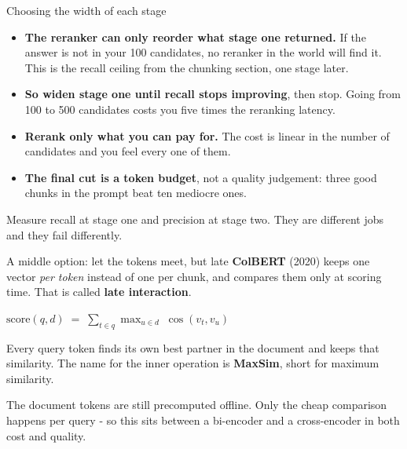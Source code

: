\documentclass[aspectratio=169]{beamer}
\newcommand{\keybox}[1]{%
  \begin{tcolorbox}[colback=armblue!8, colframe=armblue, boxrule=0.6pt, arc=2pt]
  #1
  \end{tcolorbox}}
\newcommand{\takebox}[1]{%
  \begin{tcolorbox}[colback=paramgreen!8, colframe=paramgreen, boxrule=0.6pt, arc=2pt]
  #1
  \end{tcolorbox}}
\begin{document}
\begin{frame}{Choosing the width of each stage}
  \vspace{0.7em}
  \begin{itemize}
    \item \textbf{The reranker can only reorder what stage one returned.} If the answer is
      not in your 100 candidates, no reranker in the world will find it. This is the recall
      ceiling from the chunking section, one stage later.
    \item \textbf{So widen stage one until recall stops improving}, then stop. Going from
      100 to 500 candidates costs you five times the reranking latency.
    \item \textbf{Rerank only what you can pay for.} The cost is linear in the number of
      candidates and you feel every one of them.
    \item \textbf{The final cut is a token budget}, not a quality judgement: three good
      chunks in the prompt beat ten mediocre ones.
  \end{itemize}

  \vspace{0.7em}
  \takebox{Measure recall at stage one and precision at stage two. They are different jobs
  and they fail differently.}
\end{frame}

\begin{frame}{A middle option: let the tokens meet, but late}
  \vspace{0.6em}
  \textbf{ColBERT} (2020) keeps one vector \emph{per token} instead of one per chunk, and
  compares them only at scoring time. That is called \textbf{late interaction}.

  \vspace{0.9em}
  \begin{center}
  \begin{tcolorbox}[colback=armblue!8, colframe=armblue, boxrule=0.8pt, arc=3pt, width=0.78\textwidth]
    \vspace{0.1em}
    \begin{center}
    $\displaystyle \text{score}(q, d) \;=\; \sum_{t \in q} \max_{u \in d}\; \cos(v_t, v_u)$
    \end{center}
    \vspace{0.1em}
  \end{tcolorbox}
  \end{center}

  \vspace{0.7em}
  Every query token finds its own best partner in the document and keeps that similarity.
  The name for the inner operation is \textbf{MaxSim}, short for maximum similarity.

  \vspace{0.7em}
  \keybox{The document tokens are still precomputed offline. Only the cheap comparison
  happens per query - so this sits between a bi-encoder and a cross-encoder in both cost
  and quality.}
\end{frame}
\end{document}
